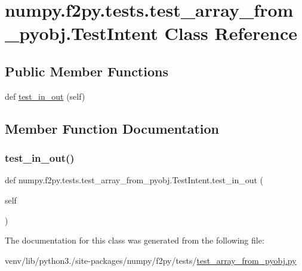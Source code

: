\hypertarget{classnumpy_1_1f2py_1_1tests_1_1test__array__from__pyobj_1_1TestIntent}{}\section{numpy.\+f2py.\+tests.\+test\+\_\+array\+\_\+from\+\_\+pyobj.\+Test\+Intent Class Reference}
\label{classnumpy_1_1f2py_1_1tests_1_1test__array__from__pyobj_1_1TestIntent}
\subsection*{Public Member Functions}
\begin{DoxyCompactItemize}
\item 
def \hyperlink{classnumpy_1_1f2py_1_1tests_1_1test__array__from__pyobj_1_1TestIntent_a325acad493ec0da9eba0070b3ef79c74}{test\+\_\+in\+\_\+out} (self)
\end{DoxyCompactItemize}


\subsection{Member Function Documentation}
\mbox{\label{classnumpy_1_1f2py_1_1tests_1_1test__array__from__pyobj_1_1TestIntent_a325acad493ec0da9eba0070b3ef79c74}} 
\subsubsection{\texorpdfstring{test\+\_\+in\+\_\+out()}{test\_in\_out()}}
{\footnotesize\ttfamily def numpy.\+f2py.\+tests.\+test\+\_\+array\+\_\+from\+\_\+pyobj.\+Test\+Intent.\+test\+\_\+in\+\_\+out (\begin{DoxyParamCaption}\item[{}]{self }\end{DoxyParamCaption})}



The documentation for this class was generated from the following file\+:\begin{DoxyCompactItemize}
\item 
venv/lib/python3./site-\/packages/numpy/f2py/tests/\hyperlink{test__array__from__pyobj_8py}{test\+\_\+array\+\_\+from\+\_\+pyobj.\+py}\end{DoxyCompactItemize}
